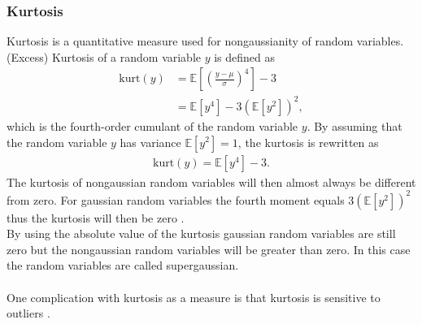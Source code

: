 \subsubsection{Kurtosis}
Kurtosis is a quantitative measure used for nongaussianity of random variables. (Excess) Kurtosis of a random variable $y$ is defined as
\begin{align*}
\text{kurt} (y) &= \mathbb{E} \left[ \left(\frac{y - \mu}{\sigma}\right)^4 \right] - 3 \\
&= \mathbb{E}[y^4] - 3 ( \mathbb{E}[y^2])^2,
\end{align*}
which is the fourth-order cumulant of the random variable $y$. By assuming that the random variable $y$ has variance $\mathbb{E}[y^2] = 1$, the kurtosis is rewritten as
\begin{align*}
\text{kurt} (y) = \mathbb{E}[y^4] - 3.
\end{align*}
The kurtosis of nongaussian random variables will then almost always be different from zero. For gaussian random variables the fourth moment equals $3(\mathbb{E}[y^2])^2$ thus the kurtosis will then be zero \cite[p. 171]{ICA}.
\\
By using the absolute value of the kurtosis gaussian random variables are still zero but the nongaussian random variables will be greater than zero. In this case the random variables are called supergaussian.
\\ \\
One complication with kurtosis as a measure is that kurtosis is sensitive to outliers \cite[p. 182]{ICA}.
 
